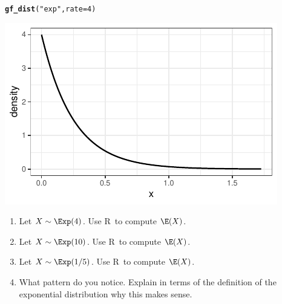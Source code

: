 \documentclass[twoside]{book}\usepackage[]{graphicx}\usepackage[]{xcolor}
\makeatletter
\def\maxwidth{ %
  \ifdim\Gin@nat@width>\linewidth
    \linewidth
  \else
    \Gin@nat@width
  \fi
}
\newcommand{\hlnum}[1]{\textcolor[rgb]{0.686,0.059,0.569}{#1}}%
\newcommand{\hlstr}[1]{\textcolor[rgb]{0.192,0.494,0.8}{#1}}%
\newcommand{\hlstd}[1]{\textcolor[rgb]{0.345,0.345,0.345}{#1}}%
\newcommand{\hlkwc}[1]{\textcolor[rgb]{0.333,0.667,0.333}{#1}}%
\newcommand{\hlkwd}[1]{\textcolor[rgb]{0.737,0.353,0.396}{\textbf{#1}}}%
\newenvironment{kframe}{%
 \def\at@end@of@kframe{}%
 \ifinner\ifhmode%
  \def\at@end@of@kframe{\end{minipage}}%
  \begin{minipage}{\columnwidth}%
 \fi\fi%
 \def\FrameCommand##1{\hskip\@totalleftmargin \hskip-\fboxsep
 \colorbox{shadecolor}{##1}\hskip-\fboxsep
     \hskip-\linewidth \hskip-\@totalleftmargin \hskip\columnwidth}%
 \MakeFramed {\advance\hsize-\width
   \@totalleftmargin\z@ \linewidth\hsize
   \@setminipage}}%
 {\par\unskip\endMakeFramed%
 \at@end@of@kframe}
\newenvironment{knitrout}{}{} %
\def\R{{\sf R}}
\newlength{\tempfmlength}
\newenvironment{fmpage}[1]
     {
	 \medskip
	 \setlength{\tempfmlength}{#1}
	 \begin{lrbox}{\fmbox}
	   \begin{minipage}{#1}
		 \vspace*{.02\tempfmlength}
		 \hfill
	   \begin{minipage}{.95 \tempfmlength}}
		 {\end{minipage}\hfill
		 \vspace*{.015\tempfmlength}
		 \end{minipage}\end{lrbox}\fbox{\usebox{\fmbox}}
	 \medskip
	 }
\newenvironment{boxedText}[1][.98\textwidth]%
{%
\begin{center}
\begin{fmpage}{#1}
}%
{%
\end{fmpage}
\end{center}
}
\makeatother
\begin{document}

\begin{knitrout}
\color{fgcolor}\begin{kframe}
\begin{alltt}
\hlkwd{gf_dist}\hlstd{(}\hlstr{"exp"}\hlstd{,} \hlkwc{rate} \hlstd{=} \hlnum{4}\hlstd{)}
\end{alltt}
\end{kframe}

{\centering \includegraphics[width=\maxwidth]{figures/fig-gf-dist-eponential-1} 

}



\end{knitrout}

\begin{problem}
	\begin{enumerate}
		\item Let $X \sim \Exp(4)$.  Use \R\ to compute $\E(X)$.
		\item Let $X \sim \Exp(10)$.  Use \R\ to compute $\E(X)$.
		\item Let $X \sim \Exp(1/5)$.  Use \R\ to compute $\E(X)$.
		\item What pattern do you notice.  Explain in terms of 
			the definition of the exponential distribution why this
			makes sense.
	\end{enumerate}
\end{problem}
\end{document}
